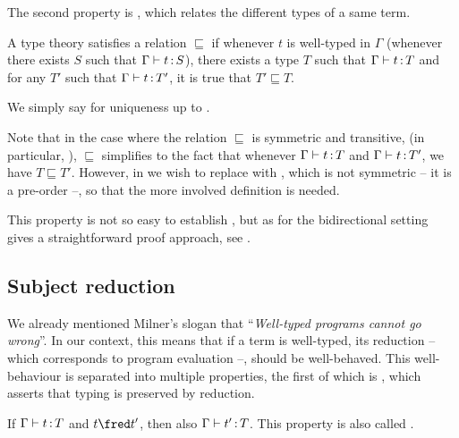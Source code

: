 The second property is , which relates the different types
of a same term.

\begin{property}
  \label{prop:uniqueness}
  A type theory satisfies  a relation $\sqsubseteq$
  if whenever $t$ is well-typed in $\Gamma$ (\ie whenever there exists $S$ such that $\Gamma \vdash t \operatorname{\mathrel{:}} S$), there exists a type $T$ such that $\Gamma \vdash t \operatorname{\mathrel{:}} T$
  and for any $T'$ such that $\Gamma \vdash t \operatorname{\mathrel{:}} T'$, it is true that $T' \sqsubseteq T$.

  We simply say  for uniqueness up to .
\end{property}

Note that in the case where the relation $\sqsubseteq$ is symmetric and transitive,
(in particular, ),  $\sqsubseteq$ simplifies
to the fact that whenever $\Gamma \vdash t \operatorname{\mathrel{:}} T$ and $\Gamma \vdash t \operatorname{\mathrel{:}} T'$,
we have $T \sqsubseteq T'$. However, in  we wish to replace  with
, which is not symmetric – it is a pre-order –, so that the more involved
definition is needed.

This property is not so easy to establish%
,
but as for  the bidirectional setting gives a straightforward proof approach,
see .

\subsection{Subject reduction}

We already mentioned Milner’s slogan that “\textit{Well-typed programs cannot go wrong}”.
In our context, this means that if a term is well-typed, its reduction – which corresponds to
program evaluation –, should be well-behaved. This well-behaviour is separated 
into multiple properties, the first of which is ,
which asserts that typing is preserved by reduction.

\begin{property}
  \label{prop:sr}
  If $\Gamma \vdash t \operatorname{\mathrel{:}} T$ and $t \red t'$, then also $\Gamma \vdash t' \operatorname{\mathrel{:}} T$.
  This property is also called .
\end{property}

